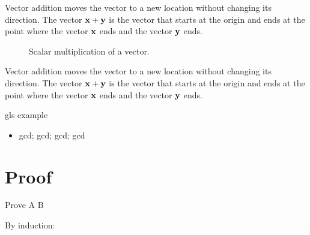 Vector addition moves the vector to a new location without changing its direction. The vector $\mathbf{x} + \mathbf{y}$ is the vector that starts at the origin and ends at the point where the vector $\mathbf{x}$ ends and the vector $\mathbf{y}$ ends.

\begin{figure}[h]
    \centering
    \caption{Scalar multiplication of a vector.}
    \label{fig:scalar-mult}
\end{figure}


Vector addition moves the vector to a new location without changing its direction. The vector $\mathbf{x} + \mathbf{y}$ is the vector that starts at the origin and ends at the point where the vector $\mathbf{x}$ ends and the vector $\mathbf{y}$ ends.


gls example
\begin{itemize}
	\item \Gls{gcd}; \acrlong{gcd}; \acrshort{gcd}; \acrfull{gcd}
\end{itemize}

\section{Proof}
\begin{lemma}
\end{lemma}
\begin{claim}
\end{claim}
\begin{theorem}
\end{theorem}
\begin{example}
\end{example}
\begin{fact}
\end{fact}
\begin{remark}
\end{remark}
\begin{exercise}
	Prove A \iff B
\end{exercise}
\begin{solution}
By induction:
\end{solution}


